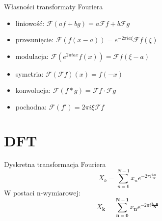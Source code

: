 \documentclass[polish, 12pt, aspectratio=169]{beamer}
\begin{document}
\begin{frame}{Własności transformaty Fouriera}
    \begin{itemize}
        \setlength\itemsep{0.5em}
        \item<2-> liniowość: \( \mathcal{F}(af + bg) = a\mathcal{F}f + b\mathcal{F}g \)
        \item<3-> przesunięcie: \( \mathcal{F}(f(x - a)) = e^{-2\pi i a \xi} \mathcal{F}f(\xi) \)
        \item<3-> modulacja: \( \mathcal{F}(e^{2\pi i a x} f(x)) = \mathcal{F}f(\xi - a) \)
        \item<4-> symetria: \( \mathcal{F}(\mathcal{F}f)(x) = f(-x) \)
        \item<5-> konwolucja: \( \mathcal{F}(f * g) = \mathcal{F}f \cdot \mathcal{F}g \)
        \item<6-> pochodna: \( \mathcal{F}(f') = 2\pi i \xi \mathcal{F}f \)
    \end{itemize}
\end{frame}

\section[DFT \\ {\normalsize Discrete Fourier Transform}]{DFT}

\begin{frame}{Dyskretna transformacja Fouriera}
    \pause{}
    \Huge
    \begin{equation*}
        X_k = \sum_{n=0}^{N-1} x_n e^{-2\pi i \frac{kn}{N}}
    \end{equation*}
    \pause{}
    \small
    W postaci n-wymiarowej:
    \normalsize
    \vspace{-1em}
    \begin{equation*}
        X_{\symbf{k}} = \sum_{\symbf{n} = \symbf{0}}^{\symbf{N} - \symbf{1}} x_{\symbf{n}} e^{-2\pi i \frac{\symbf{k \cdot n}}{\symbf{N}}}
    \end{equation*}
\end{frame}
\end{document}
